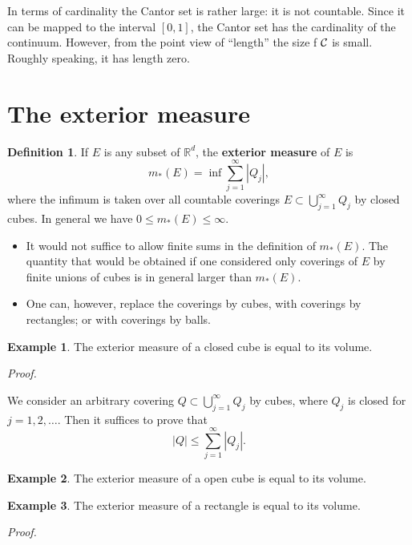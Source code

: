 \documentclass[
]{book}
\providecommand{\tightlist}{%
  \setlength{\itemsep}{0pt}\setlength{\parskip}{0pt}}
\theoremstyle{definition}
\newtheorem{definition}{Definition}[chapter]
\theoremstyle{definition}
\newtheorem{example}{Example}[chapter]
\theoremstyle{definition}
\theoremstyle{definition}
\theoremstyle{remark}
\begin{document}
In terms of cardinality the Cantor set is rather large: it is not countable. Since it can be mapped to the interval \([0,1]\), the Cantor set has the cardinality of the continuum. However, from the point view of ``length'' the size f \(\cal C\) is small. Roughly speaking, it has length zero.

\section{The exterior measure}\label{the-exterior-measure}

\begin{definition}
If \(E\) is any subset of \(\mathbb{R}^d\), the \textbf{exterior measure} of \(E\) is
\[
m_{\ast}(E) = \inf\sum_{j=1}^{\infty}|Q_j|,
\]
where the infimum is taken over all countable coverings \(E\subset \bigcup_{j=1}^{\infty}Q_j\) by closed cubes. In general we have \(0\leq m_{\ast}(E)\leq \infty\).
\end{definition}

\begin{itemize}
\tightlist
\item
  It would not suffice to allow finite sums in the definition of \(m_{\ast}(E)\). The quantity that would be obtained if one considered only coverings of \(E\) by finite unions of cubes is in general larger than \(m_{\ast}(E)\).
\item
  One can, however, replace the coverings by cubes, with coverings by rectangles; or with coverings by balls.
\end{itemize}

\begin{example}
The exterior measure of a closed cube is equal to its volume.
\end{example}

\emph{Proof.}

We consider an arbitrary covering \(Q\subset \bigcup_{j=1}^{\infty}Q_j\) by cubes, where \(Q_j\) is closed for \(j=1,2,\dots\). Then it suffices to prove that
\[
  |Q|\leq \sum_{j=1}^{\infty}|Q_j|.
  \]

\begin{example}
The exterior measure of a open cube is equal to its volume.
\end{example}

\begin{example}
The exterior measure of a rectangle is equal to its volume.
\end{example}

\emph{Proof.}
\end{document}

